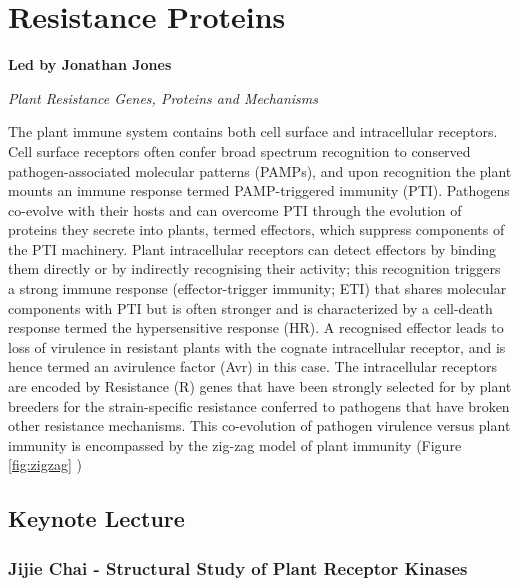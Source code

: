 \documentclass[12pt,]{book}
\theoremstyle{definition}
\theoremstyle{definition}
\theoremstyle{remark}
\begin{document}
\chapter*{Resistance Proteins}\label{resistance-proteins}

\textbf{Led by Jonathan Jones}

\emph{Plant Resistance Genes, Proteins and Mechanisms}

The plant immune system contains both cell surface and intracellular
receptors. Cell surface receptors often confer broad spectrum
recognition to conserved pathogen-associated molecular patterns (PAMPs),
and upon recognition the plant mounts an immune response termed
PAMP-triggered immunity (PTI). Pathogens co-evolve with their hosts and
can overcome PTI through the evolution of proteins they secrete into
plants, termed effectors, which suppress components of the PTI
machinery. Plant intracellular receptors can detect effectors by binding
them directly or by indirectly recognising their activity; this
recognition triggers a strong immune response (effector-trigger
immunity; ETI) that shares molecular components with PTI but is often
stronger and is characterized by a cell-death response termed the
hypersensitive response (HR). A recognised effector leads to loss of
virulence in resistant plants with the cognate intracellular receptor,
and is hence termed an avirulence factor (Avr) in this case. The
intracellular receptors are encoded by Resistance (R) genes that have
been strongly selected for by plant breeders for the strain-specific
resistance conferred to pathogens that have broken other resistance
mechanisms. This co-evolution of pathogen virulence versus plant
immunity is encompassed by the zig-zag model of plant immunity (Figure
\ref{fig:zigzag} )

\section*{Keynote Lecture}\label{keynote-lecture}

\subsection*{Jijie Chai - Structural Study of Plant Receptor
Kinases}\label{jijie-chai---structural-study-of-plant-receptor-kinases}
\end{document}
